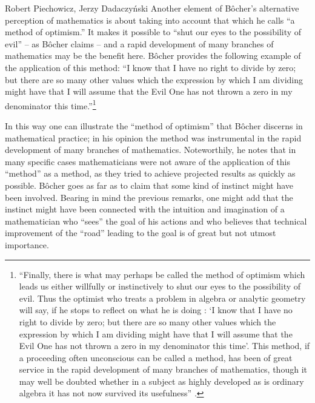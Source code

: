 \begin{artengenv}{Robert Piechowicz, Jerzy Dadaczyński}
Another element of Bôcher's alternative perception of mathematics is about taking into account that which he calls ``a method of optimism.'' It makes it possible to ``shut our eyes to the possibility of evil'' -- as Bôcher claims -- and a rapid development of many branches of mathematics may be the benefit here. Bôcher provides the following example of the application of this method: ``I know that I have no right to divide by zero; but there are so many other values which the expression by which I am dividing might have that I will assume that the Evil One has not thrown a zero in my denominator this time.''\footnote{``Finally, there is what may perhaps be called the method of optimism which leads us either willfully or instinctively to shut our eyes to the possibility of evil. Thus the optimist who treats a problem in algebra or analytic geometry will say, if he stops to reflect on what he is doing : ‘I know that I have no right to divide by zero; but there are so many other values which the expression by which I am dividing might have that I will assume that the Evil One has not thrown a zero in my denominator this time'. This method, if a proceeding often unconscious can be called a method, has been of great service in the rapid development of many branches of mathematics, though it may well be doubted whether in a subject as highly developed as is ordinary algebra it has not now survived its usefulness''
\parencite[][pp.134–135]{bocher_fundamental_1904}.%
}

In this way one can illustrate the ``method of optimism'' that Bôcher discerns in mathematical practice; in his opinion the method was instrumental in the rapid development of many branches of mathematics. Noteworthily, he notes that in many specific cases mathematicians were not aware of the application of this ``method'' as a method, as they tried to achieve projected results as quickly as possible. Bôcher goes as far as to claim that some kind of instinct might have been involved. Bearing in mind the previous remarks, one might add that the instinct might have been connected with the intuition and imagination of a mathematician who ``sees'' the goal of his actions and who believes that technical improvement of the ``road'' leading to the goal is of great but not utmost importance.


\end{artengenv}

